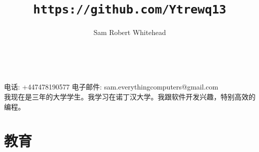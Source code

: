 \documentclass[10pt]{extarticle}
\renewcommand{\maketitle}{
    {
    \centering
        \huge\bfseries\theauthor{}\\
        \Large\thetitle{}\par
    }
}
\begin{document}
    \title{\texttt{https://github.com/Ytrewq13}}
    \author{Sam Robert Whitehead}

    \maketitle

    \pagestyle{empty}

    电话: +447478190577
    \hfill
    电子邮件: sam.everythingcomputers@gmail.com\\
    {}
    \vspace{1mm}
    我现在是三年的大学学生。我学习在诺丁汉大学。我跟软件开发兴趣，特别高效的编程。
    \section{教育} %
\end{document}
